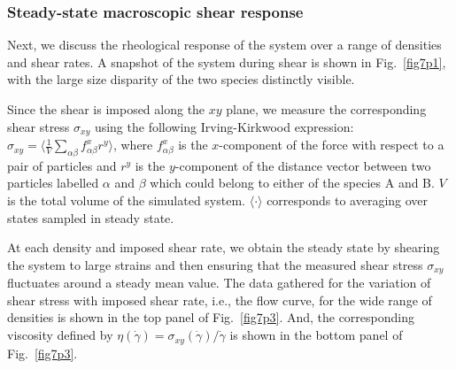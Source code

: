\subsubsection{Steady-state macroscopic shear response}
%
Next, we discuss the rheological response of the system over a range of densities and shear rates. A snapshot of the system during shear is shown in Fig.~\ref{fig7p1}, with the large size disparity of the two species distinctly visible.

Since the shear is imposed along the $xy$ plane, we measure the corresponding shear stress $\sigma_{xy}$ using the following Irving-Kirkwood expression: $\sigma_{xy} = \langle \frac{1}{V} \sum_{\alpha\beta} f^{x}_{\alpha\beta} r^{y} \rangle$, where $f^{x}_{\alpha\beta}$ is the $x$-component of the force with respect to a pair of particles and $r^y$ is the $y$-component of the distance vector between two particles labelled $\alpha$ and $\beta$ which could belong to either of the species A and B. $V$ is the total volume of the simulated system.  $\langle\cdot\rangle$ corresponds to averaging over states sampled in steady state.

At each density and imposed shear rate, we obtain the steady state by shearing the system to large strains and then ensuring that the measured shear stress $\sigma_{xy}$ fluctuates around a steady mean value. The data gathered for the variation of shear stress with imposed shear rate, i.e., the flow curve, for the wide range of densities is shown in the top panel of Fig.~\ref{fig7p3}. And, the corresponding viscosity defined by $\eta (\dot{\gamma}) = \sigma_{xy}(\dot{\gamma})/\dot{\gamma}$ is shown in the bottom panel of Fig.~\ref{fig7p3}.

